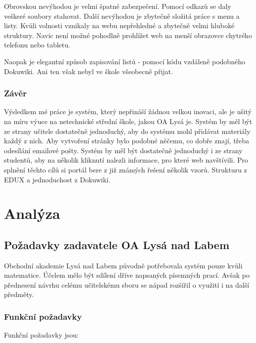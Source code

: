\documentclass[thesis=B,czech]{FITthesis}[2012/06/26]
\begin{document}
Obrovskou nevýhodou je velmi špatné zabezpečení. Pomocí odkazů se daly veškeré soubory stahovat. Další nevýhodou je zbytečně složitá práce s menu a listy. Kvůli volnosti vznikaly na webu nepřehledné a zbytečně velmi hluboké struktury. Navíc není možné pohodlně prohlížet web na menší obrazovce chytrého telefonu nebo tabletu.

Naopak je elegantní způsob zapisování listů - pomocí kódu vzdáleně podobného Dokuwiki. Ani ten však nebyl ve škole všeobecně přijat.

\subsection{Závěr}

Výsledkem mé práce je systém, který nepřináší žádnou velkou inovaci, ale je ušitý na míru výuce na netechnické střední škole, jakou OA Lysá je. Systém by měl být ze strany učitele dostatečně jednoduchý, aby do systému mohl přidávat materiály každý z nich. Aby vytvoření stránky bylo podobné něčemu, co dobře znají, třeba odesílání emailové pošty. Systém by měl být dostatečně jednoduchý i ze strany studentů, aby na několik kliknutí nalezli informace, pro které web navštívili. Pro splnění těchto cílů si portál bere z již známých řešení několik vzorů. Strukturu z EDUX a jednoduchost z Dokuwiki.


\chapter{Analýza}

\section{Požadavky zadavatele OA Lysá nad Labem}

Obchodní akademie Lysá nad Labem původně potřebovala systém pouze kvůli matematice. Účelem mělo být sdílení dříve napsaných písemných prací. Avšak po přednesení návrhu celému učitelskému sboru se nápad rozšířil o využití i na další předměty.

\subsection{Funkční požadavky}

Funkční požadavky  jsou:
\end{document}
